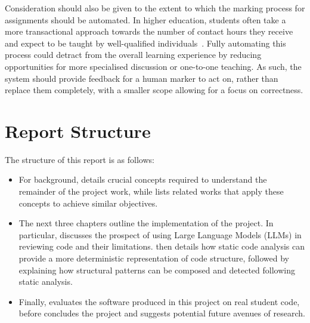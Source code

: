 Consideration should also be given to the extent to which the marking process for assignments should be automated. In higher education, students often take a more transactional approach towards the number of contact hours they receive and expect to be taught by well-qualified individuals~\cite{StudentExpectations}. Fully automating this process could detract from the overall learning experience by reducing opportunities for more specialised discussion or one-to-one teaching. As such, the system should provide feedback for a human marker to act on, rather than replace them completely, with a smaller scope allowing for a focus on correctness.

\section{Report Structure}
The structure of this report is as follows:
\begin{itemize}
    \item For background,  details crucial concepts required to understand the remainder of the project work, while  lists related works that apply these concepts to achieve similar objectives.
    \item The next three chapters outline the implementation of the project. In particular,  discusses the prospect of using Large Language Models (LLMs) in reviewing code and their limitations.  then details how static code analysis can provide a more deterministic representation of code structure, followed by  explaining how structural patterns can be composed and detected following static analysis.
    \item Finally,  evaluates the software produced in this project on real student code, before  concludes the project and suggests potential future avenues of research.
\end{itemize}

